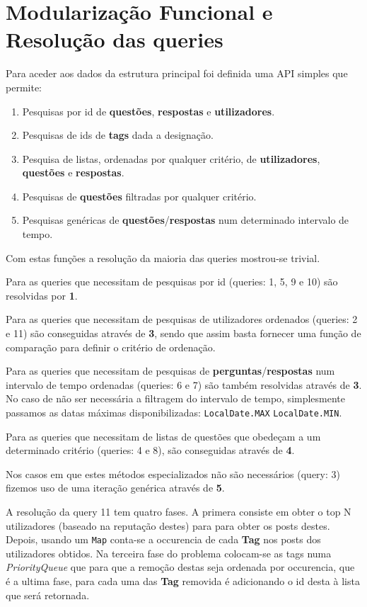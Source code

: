 \documentclass[10pt,a4paper]{report}
\begin{document}
\chapter{Modularização Funcional e Resolução das queries}
    Para aceder aos dados da estrutura principal foi definida uma API
    simples que permite:
    \begin{enumerate}[1.]
        \item Pesquisas por id de \textbf{questões}, \textbf{respostas} e
        \textbf{utilizadores}.
        \item Pesquisas de ids de \textbf{tags} dada a designação.
        \item Pesquisa de listas, ordenadas por qualquer critério, de
        \textbf{utilizadores}, \textbf{questões} e \textbf{respostas}.
        \item Pesquisas de \textbf{questões} filtradas por qualquer critério.
        \item Pesquisas genéricas de \textbf{questões}/\textbf{respostas}
        num determinado intervalo de tempo.
    \end{enumerate}

    Com estas funções a resolução da maioria das queries mostrou-se
    trivial.

    Para as queries que necessitam de pesquisas por id (queries: 1, 5, 9 e 10)
    são resolvidas por \textbf{1}.

    Para as queries que necessitam de pesquisas de utilizadores ordenados
    (queries: 2 e 11) são conseguidas através de \textbf{3}, sendo que assim
    basta fornecer uma função de comparação para definir o critério de ordenação.

    Para as queries que necessitam de pesquisas de
    \textbf{perguntas}/\textbf{respostas} num intervalo de tempo ordenadas
    (queries: 6 e 7) são também resolvidas através de \textbf{3}. No caso de não
    ser necessária a filtragem do intervalo de tempo, simplesmente passamos as
    datas máximas disponibilizadas: \texttt{LocalDate.MAX}
    \texttt{LocalDate.MIN}.

    Para as queries que necessitam de listas de questões que obedeçam a um
    determinado critério (queries: 4 e 8), são conseguidas através de \textbf{4}.

    Nos casos em que estes métodos especializados não são necessários (query: 3)
    fizemos uso de uma iteração genérica através de \textbf{5}.

    A resolução da query 11 tem quatro fases. A primera consiste em obter o top N
    utilizadores (baseado na reputação destes) para para obter os posts destes.
    Depois, usando um \texttt{Map} conta-se a occurencia de cada
    \textbf{Tag} nos posts dos utilizadores obtidos. Na terceira fase do problema
    colocam-se as tags numa \textit{PriorityQueue} que para que a remoção destas
    seja ordenada por occurencia, que é a ultima fase, para cada uma das
    \textbf{Tag} removida é adicionando o id desta à lista que será retornada.
\end{document}
